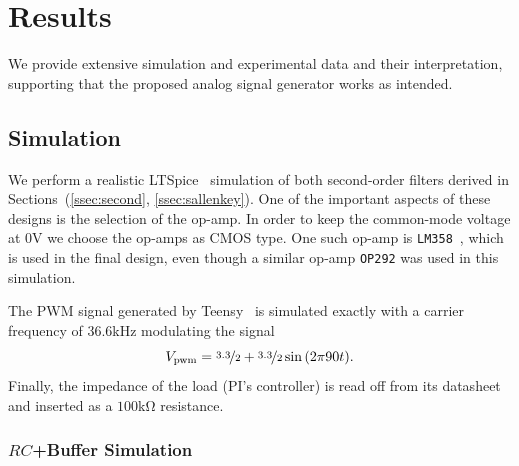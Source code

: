 \vspace{-1em}
\section{Results}
\label{sec:results}
\vspace{-1em}

We provide extensive simulation and experimental data and their interpretation,
supporting that the proposed analog signal generator works as intended.

\vspace{-1em}
\subsection{Simulation}
\vspace{-1em}

We perform a realistic LTSpice~\cite{ltspice} simulation of both second-order
filters derived in Sections~(\ref{ssec:second}, \ref{ssec:sallenkey}). One of
the important aspects of these designs is the selection of the op-amp. In order
to keep the common-mode voltage at $0$\unit{\volt} we choose the op-amps as CMOS
type. One such op-amp is \texttt{LM358}~\cite{lm358}, which is used in the final
design, even though a similar op-amp \texttt{OP292} was used in this simulation.

The PWM signal generated by Teensy~\cite{teensy} is simulated exactly with a
carrier frequency of $36.6$\unit{\kilo\hertz} modulating the signal \[
V_{\text{pwm}} = \nicefrac{3.3}{2} + \nicefrac{3.3}{2}\sin{(2\pi 90 t)}.\]
Finally, the impedance of the load (PI's controller) is read off from its
datasheet and inserted as a $100$\unit{\kilo\ohm} resistance. 

\vspace{-1em}
\subsubsection{$RC$+Buffer Simulation} 
\vspace{-1em}

